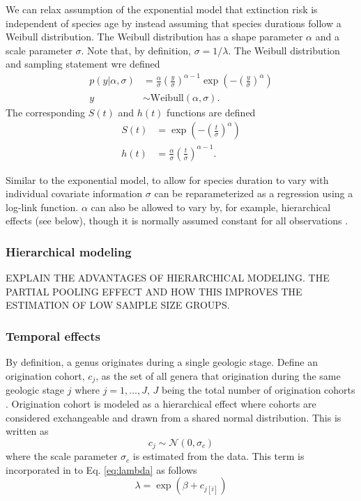 \documentclass[12pt,letterpaper]{article}
\begin{document}
We can relax assumption of the exponential model that extinction risk is independent of species age by instead assuming that species durations follow a Weibull distribution. The Weibull distribution has a shape parameter \(\alpha\) and a scale parameter \(\sigma\). Note that, by definition, \(\sigma = 1 / \lambda\). The Weibull distribution and sampling statement wre defined
\begin{equation}
  \begin{aligned}
    p(y | \alpha, \sigma) &= \frac{\alpha}{\sigma} \left(\frac{y}{\sigma}\right)^{\alpha - 1} \exp\left(-\left(\frac{y}{\sigma}\right)^{\alpha}\right) \nonumber \\
    y &\sim \mathrm{Weibull}(\alpha, \sigma).
  \end{aligned}
  \label{eq:weibull}
\end{equation}
The corresponding \(S(t)\) and \(h(t)\) functions are defined
\begin{align}
  S(t) &= \exp\left(-\left(\frac{t}{\sigma}\right)^{\alpha}\right) \label{eq:wei_surv} \\
  h(t) &= \frac{\alpha}{\sigma}\left(\frac{t}{\sigma}\right)^{\alpha - 1} \label{eq:wei_haz}.
\end{align}

Similar to the exponential model, to allow for species duration to vary with individual covariate information \(\sigma\) can be reparameterized as a regression \citep{Klein2003} using a log-link function. \(\alpha\) can also be allowed to vary by, for example, hierarchical effects (see below), though it is normally assumed constant for all observations \citep{Klein2003}.

\subsubsection{Hierarchical modeling}
\uppercase{Explain the advantages of hierarchical modeling. The partial pooling effect and how this improves the estimation of low sample size groups.}

\subsubsection{Temporal effects}

By definition, a genus originates during a single geologic stage. Define an origination cohort, \(c_{j}\), as the set of all genera that origination during the same geologic stage \(j\) where \(j = 1, \dots, J\), \(J\) being the total number of origination cohorts \citep{Raup1978}. Origination cohort is modeled as a hierarchical effect where cohorts are considered exchangeable and drawn from a shared normal distribution. This is written as 
\begin{equation}
  c_{j} \sim \mathcal{N}(0, \sigma_{c})
  \label{eq:cohort}
\end{equation}
where the scale parameter \(\sigma_{c}\) is estimated from the data. This term is incorporated in to Eq. \ref{eq:lambda} as follows
\begin{equation}
  \lambda = \exp(\beta + c_{j[i]})
  \label{eq:lambda_cohort}
\end{equation}
\end{document}
